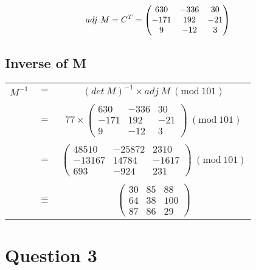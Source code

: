 \documentclass{article}
\numberwithin{equation}{subsection}
\begin{document}
	\begin{equation}\notag
		adj\ M = C^T = \begin{pmatrix}
										630 & -336 & 30 \\
										-171 & 192 & -21 \\
										9 & -12 & 3
									\end{pmatrix}
	\end{equation}
	
	\newpage
	\thispagestyle{fancy}

	\subsection*{Inverse of M}
	\begin{center}
		
	\begin{tabular}{c c c}
		$M^{-1} $ &$=$& 	$(det\ M )^{-1} \times adj\ M	\ (\textrm{mod}\ 101)$ \\
							\\
							&$=$	&	$ 77 \times 	\begin{pmatrix} 
										630 & -336 & 30 \\
										-171 & 192 & -21 \\
										9 & -12 & 3
									\end{pmatrix} \ (\textrm{mod}\ 101)$ 
									\\
									\\	
							&$=$& $\begin{pmatrix}
											48510 & -25872 & 2310 \\
											-13167 & 14784 & -1617 \\
											693 & -924 & 231
										\end{pmatrix}\ (\textrm{mod}\ 101)$
										\\	
										\\

							&$\equiv$& $\begin{pmatrix}
														30 & 85 & 88 \\
														64 & 38 & 100 \\
														87 & 86 & 29
													\end{pmatrix}$
	\end{tabular}
	\end{center}

	\vspace{30pt}
	\section*{Question 3}
	
\end{document}
